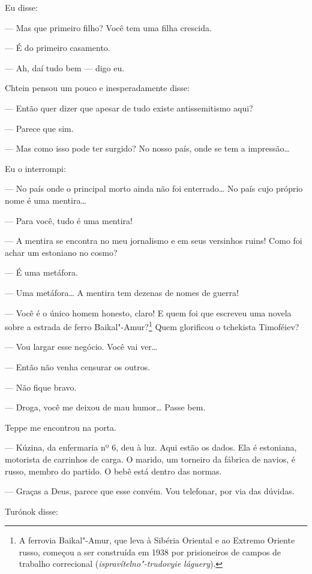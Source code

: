 Eu disse:

--- Mas que primeiro filho? Você tem uma filha crescida.

--- É do primeiro casamento.

--- Ah, daí tudo bem --- digo eu.

Chtein pensou um pouco e inesperadamente disse:

--- Então quer dizer que apesar de tudo existe antissemitismo aqui?

--- Parece que sim.

--- Mas como isso pode ter surgido? No nosso país, onde se tem a
impressão\ldots{}

Eu o interrompi:

--- No país onde o principal morto ainda não foi enterrado\ldots{} No país
cujo próprio nome é uma mentira\ldots{}

--- Para você, tudo é uma mentira!

--- A mentira se encontra no meu jornalismo e em seus versinhos ruins!
Como foi achar um estoniano no cosmo?

--- É uma metáfora.

--- Uma metáfora\ldots{} A mentira tem dezenas de nomes de guerra!

--- Você é o único homem honesto, claro! E quem foi que escreveu uma
novela sobre a estrada de ferro Baikal"-Amur?\footnote{A ferrovia
  Baikal"-Amur, que leva à Sibéria Oriental e ao Extremo Oriente russo,
  começou a ser construída em 1938 por prisioneiros de campos de
  trabalho correcional (\emph{ispravítelno"-trudovyie láguery}).} Quem
glorificou o tchekista Timoféiev?

--- Vou largar esse negócio. Você vai ver\ldots{}

--- Então não venha censurar os outros.

--- Não fique bravo.

--- Droga, você me deixou de mau humor\ldots{} Passe bem.

\bigskip

Teppe me encontrou na porta.

--- Kúzina, da enfermaria nº 6, deu à luz. Aqui estão os dados. Ela é \label{ref4}
estoniana, motorista de carrinhos de carga. O marido, um torneiro da
fábrica de navios, é russo, membro do partido. O bebê está dentro das
normas.

--- Graças a Deus, parece que esse convém. Vou telefonar, por via das
dúvidas.

Turónok disse:

